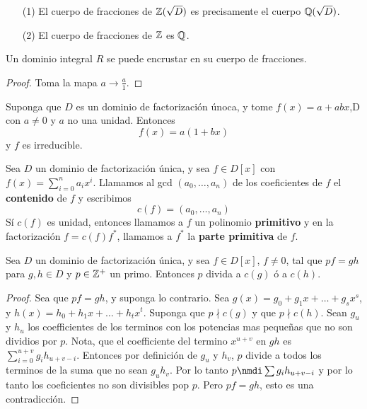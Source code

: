 \begin{example}\label{}
    \begin{enumerate}
        \item[(1)] El cuerpo de fracciones de $\mathbb{Z}(\sqrt{D})$ es precisamente el
            cuerpo $\mathbb{Q}(\sqrt{D})$.

        \item[(2)] El cuerpo de fracciones de $\mathbb{Z}$ es $\mathbb{Q}$.
    \end{enumerate}
\end{example}

\begin{lemma}\label{18.73}
    Un dominio integral $R$ se puede encrustar en su cuerpo de fracciones.
\end{lemma}
\begin{proof}
    Toma la mapa $a \xrightarrow{} \frac{a}{1}$.
\end{proof}

Suponga que $D$ es un dominio de factorizaci\'on \'unoca, y tome  $f(x)=a+abx$,D
con $a \neq 0$ y  $a$ no una unidad. Entonces
\begin{equation*}
    f(x)=a(1+bx)
\end{equation*}
y $f$ es irreducible.

\begin{definition}
    Sea $D$ un dominio de factorizaci\'on \'unica, y sea $f \in D[x]$ con
    $f(x)=\sum_{i=0}^n{a_ix^i}$. Llamamos al gcd $(a_0, \dots, a_n)$ de los
    coeficientes de $f$ el \textbf{contenido} de $f$ y escribimos
    \begin{equation*}
        c(f)=(a_0, \dots, a_n)
    \end{equation*}
    S\'i $c(f)$ es unidad, entonces llamamos a $f$ un polinomio
    \textbf{primitivo} y en la factorizaci\'on $f=c(f)f^*$, llamamos a $f^*$ la
     \textbf{parte primitiva} de $f$.
\end{definition}

\begin{lemma}\label{18.74}
    Sea $D$ un dominio de factorizaci\'on \'unica, y sea $f \in D[x]$,  $f \neq
    0$, tal que  $pf=gh$ para $g,h \in D$ y $p \in \mathbb{Z}^+$ un primo. Entonces $p$
    divida a $c(g)$ \'o a $c(h)$.
\end{lemma}
\begin{proof}
    Sea que $pf=gh$, y suponga lo contrario. Sea  $g(x)=g_0+g_1x+\dots+g_sx^s$,
    y $h(x)=h_0+h_1x+\dots+h_tx^t$. Suponga que $p \nmid c(g)$ y que $p \nmid
    c(h)$. Sean $g_u$ y  $h_u$ los coefficientes de los terminos con los
    potencias mas peque\~nas que no son dividios por $p$. Nota, que el
    coefficiente del termino $x^{u+v}$ en $gh$ es
    $\sum_{i=0}^{u+v}{g_ih_{u+v-i}}$. Entonces por definici\'on de $g_u$ y
    $h_v$, $p$ divide a todos los terminos de la suma que no sean $g_uh_v$. Por
    lo tanto  $p \nmdi \sum{g_ih_{u+v-i}}$ y por lo tanto los coeficientes no
    son divisibles pop $p$. Pero $pf=gh$, esto es una contradicci\'on.
\end{proof}

